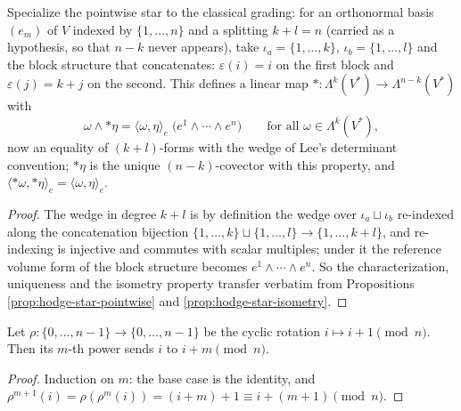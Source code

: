 \begin{proposition}
\label{prop:hodge-star-graded}
\leanok
{}
Specialize the pointwise star to the classical grading: for an orthonormal basis $(e_m)$ of $V$ indexed by $\{1, \ldots, n\}$ and a splitting $k + l = n$ (carried as a hypothesis, so that $n - k$ never appears), take $\iota_a = \{1,\ldots,k\}$, $\iota_b = \{1,\ldots,l\}$ and the block structure that concatenates: $\varepsilon(i) = i$ on the first block and $\varepsilon(j) = k + j$ on the second. This defines a linear map ${*} \colon \Lambda^k(V^*) \to \Lambda^{n-k}(V^*)$ with
\[
\omega \wedge {*}\eta = \langle \omega, \eta \rangle_e\;\big(e^1 \wedge \cdots \wedge e^n\big) \qquad \text{for all } \omega \in \Lambda^k(V^*),
\]
now an equality of $(k+l)$-forms with the wedge of Lee's determinant convention; ${*}\eta$ is the unique $(n-k)$-covector with this property, and $\langle {*}\omega, {*}\eta \rangle_e = \langle \omega, \eta \rangle_e$.
\end{proposition}
\begin{proof}
\leanok
The wedge in degree $k + l$ is by definition the wedge over $\iota_a \sqcup \iota_b$ re-indexed along the concatenation bijection $\{1,\ldots,k\} \sqcup \{1,\ldots,l\} \to \{1,\ldots,k+l\}$, and re-indexing is injective and commutes with scalar multiples; under it the reference volume form of the block structure becomes $e^1 \wedge \cdots \wedge e^n$. So the characterization, uniqueness and the isometry property transfer verbatim from Propositions \ref{prop:hodge-star-pointwise} and \ref{prop:hodge-star-isometry}.
\end{proof}

\begin{lemma}
\label{lem:finrotate-pow-val}
\leanok
Let $\rho \colon \{0, \ldots, n-1\} \to \{0, \ldots, n-1\}$ be the cyclic rotation $i \mapsto i + 1 \pmod n$. Then its $m$-th power sends $i$ to $i + m \pmod n$.
\end{lemma}
\begin{proof}
\leanok
Induction on $m$: the base case is the identity, and $\rho^{m+1}(i) = \rho(\rho^m(i)) = (i + m) + 1 \equiv i + (m+1) \pmod n$.
\end{proof}

